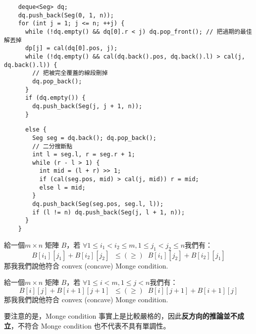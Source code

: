 \documentclass[standalone]{beamer}
\begin{document}
\begin{frame}[fragile]{}
  \begin{verbatim}
    deque<Seg> dq;
    dq.push_back(Seg(0, 1, n));
    for (int j = 1; j <= n; ++j) {
      while (!dq.empty() && dq[0].r < j) dq.pop_front(); // 把過期的最佳解丟掉
      dp[j] = cal(dq[0].pos, j);
      while (!dq.empty() && cal(dq.back().pos, dq.back().l) > cal(j, dq.back().l)) {
        // 把被完全覆蓋的線段刪掉
        dq.pop_back();
      }
      if (dq.empty()) {
        dq.push_back(Seg(j, j + 1, n));
      }
  \end{verbatim}
\end{frame}

\begin{frame}[fragile]{}
  \begin{verbatim}
      else {
        Seg seg = dq.back(); dq.pop_back();
        // 二分搜斷點
        int l = seg.l, r = seg.r + 1;
        while (r - l > 1) {
          int mid = (l + r) >> 1;
          if (cal(seg.pos, mid) > cal(j, mid)) r = mid;
          else l = mid;
        }
        dq.push_back(Seg(seg.pos, seg.l, l));
        if (l != n) dq.push_back(Seg(j, l + 1, n));
      }
    }
  \end{verbatim}
\end{frame}

\begin{frame}{}
  \begin{theorem}
    給一個$m \times n$ 矩陣 $B$，若 $\forall 1\leq i_1<i_2 \leq m, 1\leq j_1<j_2\leq n$我們有：
    $$B[i_1][j_1]+B[i_2][j_2] \;\;\leq (\geq)\;\; B[i_1][j_2]+B[i_2][j_1]$$
    那我我們說他符合 convex (concave) Monge condition.
  \end{theorem}
  \begin{theorem}
    給一個$m \times n$ 矩陣 $B$，若 $\forall 1\leq i<m, 1\leq j< n$我們有：
    $$B[i][j]+B[i+1][j+1] \;\;\leq (\geq)\;\; B[i][j+1]+B[i+1][j]$$
    那我我們說他符合 convex (concave) Monge condition.
  \end{theorem}
\end{frame}

\begin{frame}{}
  要注意的是，Monge condition 事實上是比較嚴格的，因此\textbf{反方向的推論並不成立}，不符合 Monge condition 也不代表不具有單調性。
\end{frame}
\end{document}
